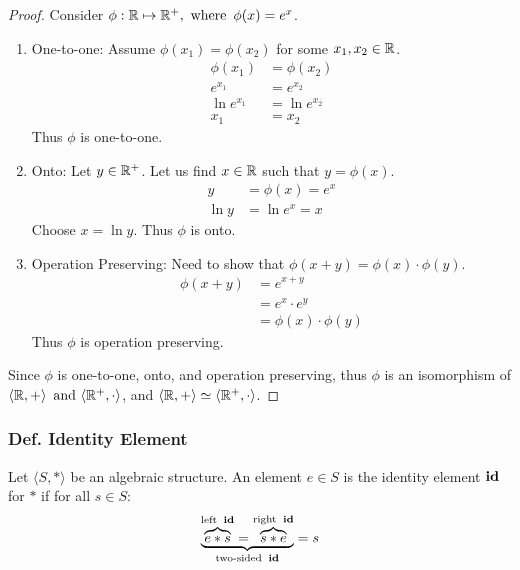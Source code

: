 \begin{proof}
    Consider $\phi: \mathbb{R} \mapsto \mathbb{R}^+, \operatorname{~\text{where}~} \phi(x) = e^x$.
    \begin{enumerate}
        \item One-to-one: Assume $\phi(x_1) = \phi(x_2)$ for some $x_1,x_2 \in \mathbb{R}$.
              \begin{align*}
                  \phi(x_1)   & = \phi(x_2)   \\
                  e^{x_1}     & = e^{x_2}     \\
                  \ln e^{x_1} & = \ln e^{x_2} \\
                  x_1         & = x_2
              \end{align*}
              Thus $\phi$ is one-to-one.
        \item Onto: Let $y \in \mathbb{R}^+$. Let us find $x \in \mathbb{R}$ such that $y = \phi(x)$.
              \begin{align*}
                  y     & = \phi(x) = e^x \\
                  \ln y & = \ln e^x = x
              \end{align*}
              Choose $x = \ln y$. Thus $\phi$ is onto.
        \item Operation Preserving: Need to show that $\phi(x + y) = \phi(x) \cdot \phi(y)$.
              \begin{align*}
                  \phi(x+y) & = e^{x+y}               \\
                            & = e^x \cdot e^y         \\
                            & = \phi(x) \cdot \phi(y)
              \end{align*}
              Thus $\phi$ is operation preserving.
    \end{enumerate}
    Since $\phi$ is one-to-one, onto, and operation preserving, thus $\phi$ is an isomorphism of $\langle \mathbb{R},+\rangle \operatorname{~\text{and}~} \langle \mathbb{R}^+, \cdot \rangle$, and $\langle \mathbb{R},+\rangle \simeq \langle \mathbb{R}^+, \cdot \rangle$.
\end{proof}

\subsubsection{Def. Identity Element}
Let $\langle S, * \rangle$ be an algebraic structure. An element $e \in S$ is the identity element $\operatorname{\textbf{id}}$ for $*$ if for all $s \in S$:
\[
    \underbrace{\overbrace{e * s}^{\text{left}~\operatorname{\textbf{id}}} = \overbrace{s * e}^{\text{right}~\operatorname{\textbf{id}}}}_{\text{two-sided}~\operatorname{\textbf{id}}} = s
\]

